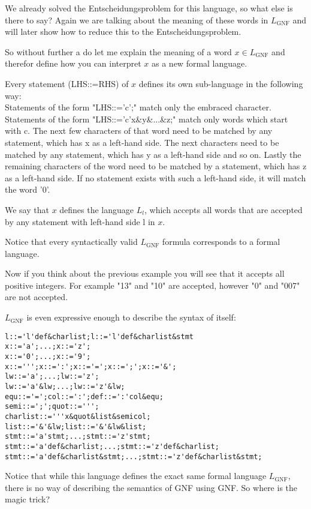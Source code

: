 We already solved the Entscheidungsproblem for this language, so what else is there to say?
Again we are talking about the meaning of these words in $L_{\text{GNF}}$ and will later show how to reduce this to the Entscheidungsproblem.

So without further a do let me explain the meaning of a word $x \in L_{\text{GNF}}$ and therefor define how you can interpret $x$ as a new formal language.

Every statement (LHS::=RHS) of $x$ defines its own sub-language in the following way: \\
Statements of the form "LHS::='c';" match only the embraced character. \\
Statements of the form "LHS::='c'x\&y\&...\&z;" match only words which start with c. The next few characters of that word need to be matched by any statement, which has x as a left-hand side. The next characters need to be matched by any statement, which has y as a left-hand side and so on. Lastly the remaining characters of the word need to be matched by a statement, which has z as a left-hand side. If no statement exists with such a left-hand side, it will match the word '0'.

We say that $x$ defines the language $L_l$, which accepts all words that are accepted by any statement with left-hand side l in $x$.

Notice that every syntactically valid $L_{\text{GNF}}$ formula corresponds to a formal language.

Now if you think about the previous example you will see that it accepts all positive integers. For example "13" and "10" are accepted, however "0" and "007" are not accepted. 

$L_{\text{GNF}}$ is even expressive enough to describe the syntax of itself: \\
\begin{lstlisting}
l::='l'def&charlist;l::='l'def&charlist&stmt  
x::='a';...;x::='z';  
x::='0';...;x::='9';  
x::=''';x::=':';x::='=';x::=';';x::='&';  
lw::='a';...;lw::='z';  
lw::='a'&lw;...;lw::='z'&lw; 
equ::='=';col::=':';def::=':'col&equ;  
semi::=';';quot::=''';  
charlist::='''x&quot&list&semicol;  
list::='&'&lw;list::='&'&lw&list;  
stmt::='a'stmt;...;stmt::='z'stmt;  
stmt::='a'def&charlist;...;stmt::='z'def&charlist;
stmt::='a'def&charlist&stmt;...;stmt::='z'def&charlist&stmt;
\end{lstlisting}

Notice that while this language defines the exact same formal language $L_{\text{GNF}}$, there is no way of describing the semantics of GNF using GNF. So where is the magic trick?

